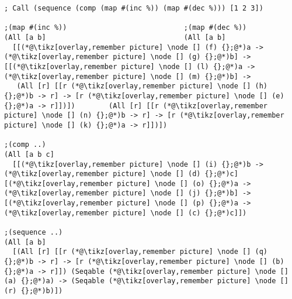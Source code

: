 \documentclass[9pt]{extarticle}
\begin{document}
\begin{lstlisting}
; Call (sequence (comp (map #(inc %)) (map #(dec %))) [1 2 3])

;(map #(inc %))                            ;(map #(dec %))
(All [a b]                                 (All [a b]
  [[(*@\tikz[overlay,remember picture] \node [] (f) {};@*)a -> (*@\tikz[overlay,remember picture] \node [] (g) {};@*)b] ->                                 [[(*@\tikz[overlay,remember picture] \node [] (l) {};@*)a -> (*@\tikz[overlay,remember picture] \node [] (m) {};@*)b] ->
   (All [r] [[r (*@\tikz[overlay,remember picture] \node [] (h) {};@*)b -> r] -> [r (*@\tikz[overlay,remember picture] \node [] (e) {};@*)a -> r]])])        (All [r] [[r (*@\tikz[overlay,remember picture] \node [] (n) {};@*)b -> r] -> [r (*@\tikz[overlay,remember picture] \node [] (k) {};@*)a -> r]])])

;(comp ..)
(All [a b c]
  [[(*@\tikz[overlay,remember picture] \node [] (i) {};@*)b -> (*@\tikz[overlay,remember picture] \node [] (d) {};@*)c] [(*@\tikz[overlay,remember picture] \node [] (o) {};@*)a -> (*@\tikz[overlay,remember picture] \node [] (j) {};@*)b] -> [(*@\tikz[overlay,remember picture] \node [] (p) {};@*)a -> (*@\tikz[overlay,remember picture] \node [] (c) {};@*)c]])

;(sequence ..)
(All [a b]
  [(All [r] [[r (*@\tikz[overlay,remember picture] \node [] (q) {};@*)b -> r] -> [r (*@\tikz[overlay,remember picture] \node [] (b) {};@*)a -> r]]) (Seqable (*@\tikz[overlay,remember picture] \node [] (a) {};@*)a) -> (Seqable (*@\tikz[overlay,remember picture] \node [] (r) {};@*)b)])
\end{lstlisting}
\end{document}
